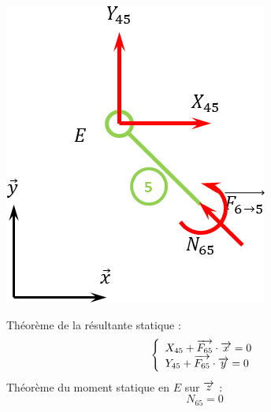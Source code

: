 \documentclass[11pt,oneside]{article}
\begin{document}
\begin{exemple}
\begin{minipage}[c]{.25\linewidth}
\begin{center}
\includegraphics[width=.9\textwidth]{png/5}
\end{center}
\end{minipage}\hfill
\begin{minipage}[c]{.7\linewidth}
Théorème de la résultante statique : 
$$
\left\{
\begin{array}{l}
X_{45}+\overrightarrow{F_{65}}\cdot\overrightarrow{x}=0 \\
Y_{45}+\overrightarrow{F_{65}}\cdot\overrightarrow{y}=0 
\end{array}
\right.
$$
Théorème du moment statique en $E$ sur $\overrightarrow{z}$ : 
$$
N_{65}=0 
$$
\end{minipage}
\end{exemple}
\end{document}
